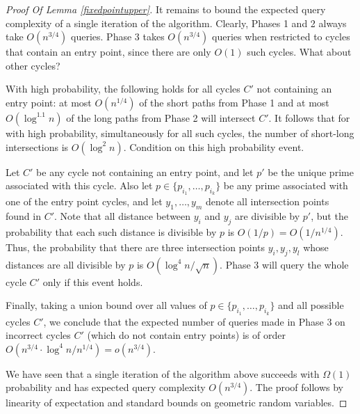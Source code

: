\documentclass[11pt]{article}
\numberwithin{equation}{section}
\newcommand{\1}{\mathbf{1}}
\begin{document}
\begin{proof}[Proof Of Lemma \ref{fixedpointupper}]
It remains to bound the expected query complexity of a single iteration of the algorithm. Clearly, Phases 1 and 2 always take $O(n^{3/4})$ queries. Phase 3 takes $O(n^{3/4})$ queries when restricted to cycles that contain an entry point, since there are only $O(1)$ such cycles. What about other cycles?

With high probability, the following holds for all cycles $C'$ not containing an entry point: at most $O(n^{1/4})$ of the short paths from Phase 1 and at most $O(\log^{1.1} n)$ of the long paths from Phase 2 will intersect $C'$. It follows that for with high probability, simultaneously for all such cycles, the number of short-long intersections is $O(\log^2 n)$. Condition on this high probability event.

Let $C'$ be any cycle not containing an entry point, and let $p'$ be the unique prime associated with this cycle. Also let $p \in \{ p_{i_1}, \ldots, p_{i_k}\}$ be any prime associated with one of the entry point cycles, and let $y_1, \ldots, y_m$ denote all intersection points found in $C'$. Note that all distance between $y_i$ and $y_j$ are divisible by $p'$, but the probability that each such distance is divisible by $p$ is $O(1/p) = O(1/n^{1/4})$. Thus, the probability that there are three intersection points $y_i, y_j, y_l$ whose distances are all divisible by $p$ is $O(\log^{4} n / \sqrt{n})$. Phase 3 will query the whole cycle $C'$ only if this event holds.

Finally, taking a union bound over all values of $p \in \{ p_{i_1}, \ldots, p_{i_k}\}$ and all possible cycles $C'$, we conclude that the expected number of queries made in Phase 3 on incorrect cycles $C'$ (which do not contain entry points) is of order $O(n^{3/4} \cdot \log^4 n / n^{1/4}) = o(n^{3/4})$. 


We have seen that a single iteration of the algorithm above succeeds with $\Omega(1)$ probability and has expected query complexity $O(n^{3/4})$. The proof follows by linearity of expectation and standard bounds on geometric random variables.
\end{proof}
\end{document}
